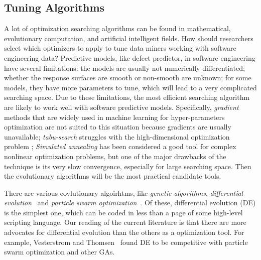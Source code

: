 


\subsection{Tuning Algorithms}

A lot of optimization searching algorithms can be found in mathematical,
evolutionary computation, and artificial intelligent fields.
How should researchers select which optimizers to apply to tune data miners working 
with software engineering data? Predictive models, like defect predictor,
in software engineering have several limitations: the models are usually not
numerically differentiated; whether the response surfaces are smooth or non-smooth are unknown;
for some models, they have more parameters to tune, which will lead to a very complicated searching space. Due to these limitations, the most efficient searching algorithm
are likely to work well with software predictive models. Specifically,
{\em gradient} methods that are widely used in machine learning\cite{bengio2000gradient,maclaurin2015gradient} for 
hyper-parameters optimization are not suited to this situation because gradients are usually unavailable; 
{\em tabu-search} struggles with
the high-dimensional optimization problem \cite{mayer1998tabu}; {\em Simulated annealing} 
has been considered a good tool for complex nonlinear optimization problems\cite{fea02a,me07f}, but one of the major drawbacks of the technique is its very slow convergence, especially for large searching space\cite{ram1996parallel}. Then the evolutionary algorithms will be
the most practical candidate tools.

There are various eovlutionary algoirhtms, like {\em genetic algorithms}\cite{goldberg79}, {\em differential evolution}~\cite{storn1997differential} and 
{\em particle swarm optimization}~\cite{pan08}.
Of these,   
differential evolution (DE) is the simplest one, which can be coded in less than a page of some high-level scripting language. Our reading of the current literature is that there are more  advocates for
differential evolution than
  the others as a optimization tool. For example,  Vesterstrom and Thomsen~\cite{Vesterstrom04} found DE to be competitive with 
  particle swarm optimization and other GAs. 
   
